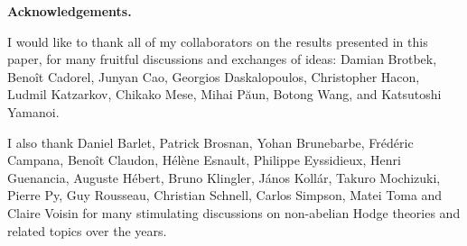 \documentclass[english]{amsproc}
\theoremstyle{plain}
\theoremstyle{definition}
\theoremstyle{remark}
\theoremstyle{plain}
\numberwithin{equation}{thm} %
\newcommand{\cD}{\mathcal D}
\newcommand{\bF}{\mathbb{F}}
\newcommand{\GL}{{\rm GL}}
\begin{document}
\begin{itemize}[noitemsep]
		\end{itemize} 
		
	\medspace
	
		\noindent\textbf{Acknowledgements.} \quad 
		
	I would like to thank all of my collaborators on the results presented in this
	paper, for many fruitful discussions and exchanges of ideas:  Damian Brotbek,
		Benoît Cadorel, Junyan Cao, Georgios Daskalopoulos, Christopher Hacon, Ludmil Katzarkov,
		Chikako Mese, Mihai Păun, Botong Wang, and Katsutoshi Yamanoi. 
		
		I also thank Daniel Barlet,  Patrick Brosnan, Yohan Brunebarbe, Frédéric Campana,
		Benoît Claudon, Hélène Esnault, Philippe Eyssidieux, Henri Guenancia, Auguste Hébert,   Bruno Klingler, János Kollár, 
		Takuro Mochizuki, Pierre Py, Guy Rousseau, Christian Schnell, Carlos Simpson,    Matei Toma and Claire Voisin for many stimulating discussions on
		non-abelian Hodge theories  and related topics over the years.
		
		
	 
\end{document}
